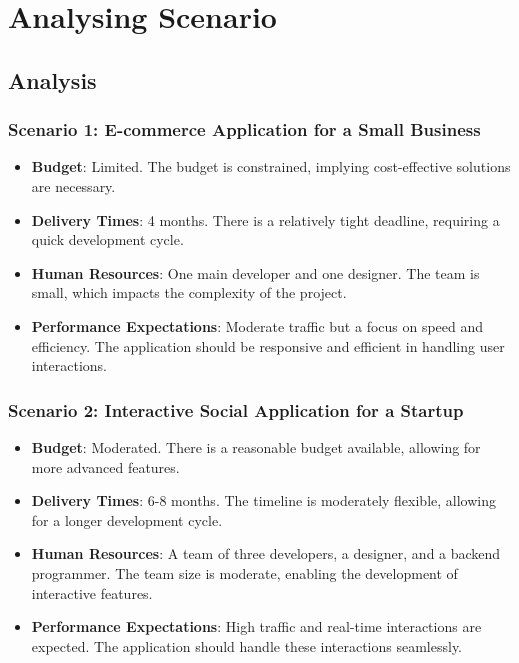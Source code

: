 \chapter{Analysing Scenario}

\section{Analysis}

\subsection*{Scenario 1: E-commerce Application for a Small Business}
\begin{itemize}
	\item \textbf{Budget}: Limited. The budget is constrained, implying cost-effective solutions are necessary.
	\item \textbf{Delivery Times}: 4 months. There is a relatively tight deadline, requiring a quick development cycle.
	\item \textbf{Human Resources}: One main developer and one designer. The team is small, which impacts the complexity of the project.
	\item \textbf{Performance Expectations}: Moderate traffic but a focus on speed and efficiency. The application should be responsive and efficient in handling user interactions.
\end{itemize}

\subsection*{Scenario 2: Interactive Social Application for a Startup}
\begin{itemize}
	\item \textbf{Budget}: Moderated. There is a reasonable budget available, allowing for more advanced features.
	\item \textbf{Delivery Times}: 6-8 months. The timeline is moderately flexible, allowing for a longer development cycle.
	\item \textbf{Human Resources}: A team of three developers, a designer, and a backend programmer. The team size is moderate, enabling the development of interactive features.
	\item \textbf{Performance Expectations}: High traffic and real-time interactions are expected. The application should handle these interactions seamlessly.
\end{itemize}

